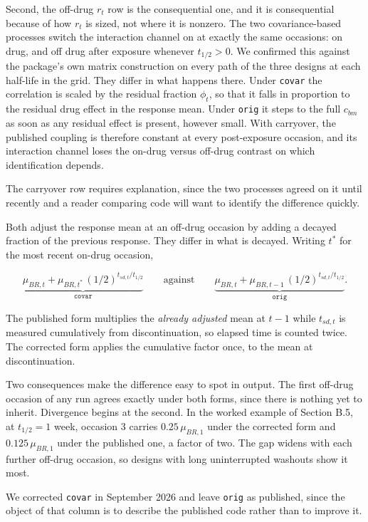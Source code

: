 \documentclass[
  11pt,
]{article}
\begin{document}
Second, the off-drug \(r_t\) row is the consequential one, and it is
consequential because of how \(r_t\) is sized, not where it is
nonzero. The two covariance-based processes switch the interaction
channel on at exactly the same occasions: on drug, and off drug after
exposure whenever \(t_{1/2} > 0\). We confirmed this against the
package's own matrix construction on every path of the three designs
at each half-life in the grid. They differ in what happens there.
Under \texttt{covar} the correlation is scaled by the residual
fraction \(\phi_t\), so that it falls in proportion to the residual
drug effect in the response mean. Under \texttt{orig} it steps to the
full \(c_{bm}\) as soon as any residual effect is present, however
small. With carryover, the published coupling is therefore constant
at every post-exposure occasion, and its interaction channel loses the
on-drug versus off-drug contrast on which identification depends.

The carryover row requires explanation, since the two processes
agreed on it until recently and a reader comparing code will want to
identify the difference quickly.

Both adjust the response mean at an off-drug occasion by adding
a decayed fraction of the previous response. They differ in what is
decayed. Writing \(t^{\ast}\) for the most recent on-drug occasion,

\[
\underbrace{\mu_{BR,t} + \mu_{BR,t^{\ast}}\,
  (1/2)^{t_{sd,t}/t_{1/2}}}_{\texttt{covar}}
\qquad\text{against}\qquad
\underbrace{\mu_{BR,t} + \mu_{BR,t-1}\,
  (1/2)^{t_{sd,t}/t_{1/2}}}_{\texttt{orig}} .
\]

The published form multiplies the \emph{already adjusted} mean at
\(t-1\) while \(t_{sd,t}\) is measured cumulatively from discontinuation,
so elapsed time is counted twice. The corrected form applies the
cumulative factor once, to the mean at discontinuation.

Two consequences make the difference easy to spot in output. The
first off-drug occasion of any run agrees exactly under both forms,
since there is nothing yet to inherit. Divergence begins at the
second. In the worked example of Section B.5, at
\(t_{1/2} = 1\) week, occasion 3 carries \(0.25\,\mu_{BR,1}\) under the
corrected form and \(0.125\,\mu_{BR,1}\) under the published one, a
factor of two. The gap widens with each further off-drug occasion, so
designs with long uninterrupted washouts show it most.

We corrected \texttt{covar} in September 2026 and
leave \texttt{orig} as published, since the object of that column is
to describe the published code rather than to improve it.
\end{document}
